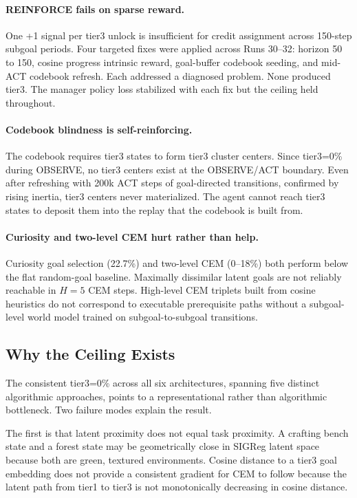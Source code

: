 \documentclass[12pt]{article}
\begin{document}
\paragraph{REINFORCE fails on sparse reward.} One +1 signal per tier3 unlock is insufficient for credit assignment across 150-step subgoal periods. Four targeted fixes were applied across Runs 30--32: horizon 50 to 150, cosine progress intrinsic reward, goal-buffer codebook seeding, and mid-ACT codebook refresh. Each addressed a diagnosed problem. None produced tier3. The manager policy loss stabilized with each fix but the ceiling held throughout.

\paragraph{Codebook blindness is self-reinforcing.} The codebook requires tier3 states to form tier3 cluster centers. Since tier3=0\% during OBSERVE, no tier3 centers exist at the OBSERVE/ACT boundary. Even after refreshing with 200k ACT steps of goal-directed transitions, confirmed by rising inertia, tier3 centers never materialized. The agent cannot reach tier3 states to deposit them into the replay that the codebook is built from.

\paragraph{Curiosity and two-level CEM hurt rather than help.} Curiosity goal selection (22.7\%) and two-level CEM (0--18\%) both perform below the flat random-goal baseline. Maximally dissimilar latent goals are not reliably reachable in $H=5$ CEM steps. High-level CEM triplets built from cosine heuristics do not correspond to executable prerequisite paths without a subgoal-level world model trained on subgoal-to-subgoal transitions.

\subsection{Why the Ceiling Exists}

The consistent tier3=0\% across all six architectures, spanning five distinct algorithmic approaches, points to a representational rather than algorithmic bottleneck. Two failure modes explain the result.

The first is that latent proximity does not equal task proximity. A crafting bench state and a forest state may be geometrically close in SIGReg latent space because both are green, textured environments. Cosine distance to a tier3 goal embedding does not provide a consistent gradient for CEM to follow because the latent path from tier1 to tier3 is not monotonically decreasing in cosine distance.
\end{document}
